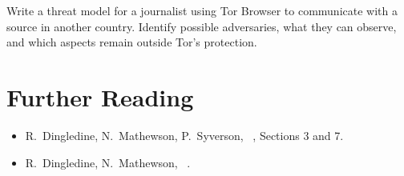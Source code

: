 \begin{esercizio}[2]\label{es:04-modello}
Write a threat model for a journalist using Tor Browser to communicate with a source in another country. Identify possible adversaries, what they can observe, and which aspects remain outside Tor's protection.
\end{esercizio}

\section*{Further Reading}
\begin{itemize}
  \item R.~Dingledine, N.~Mathewson, P.~Syverson, ~\cite{dingledine2004tor}, Sections 3 and 7.
  \item R.~Dingledine, N.~Mathewson, ~\cite{dingledine2006company}.
\end{itemize}
